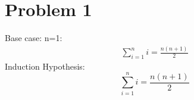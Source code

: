 \documentclass[12pt]{article}
\begin{document}
\section{Problem 1}
Base case: n=1:
\begin{align}
\sum_{i=1}^n i = \frac {n(n+1)} {2}

\end{align}
Induction Hypothesis:\\
$$\sum_{i=1}^n i = \frac {n(n+1)} {2}$$
\\
\begin{align}

\end{align}
\end{document}

